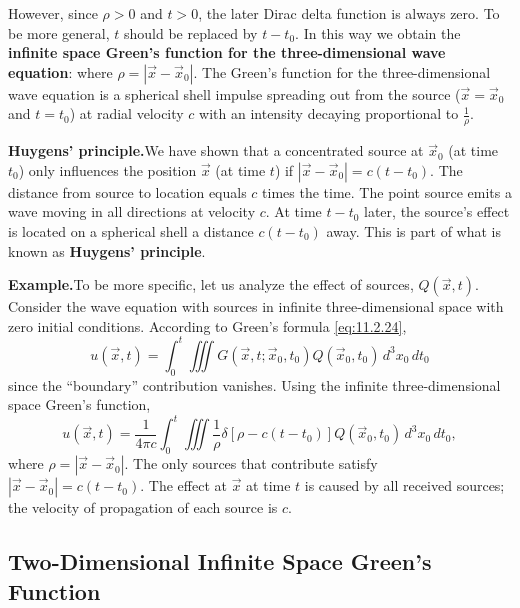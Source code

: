 However, since $\rho > 0$ and $t > 0$, the later Dirac delta function is always zero.  To be more general, $t$ should be replaced by $t - t_0$.  In this way we obtain the \textbf{infinite space Green's function for the three-dimensional wave equation}:
where $\rho = |\vec{x} - \vec{x}_0|$.  The Green's function for the three-dimensional wave equation is a spherical shell impulse spreading out from the source ($\vec{x} = \vec{x}_0$ and $t = t_0$) at radial velocity $c$ with an intensity decaying proportional to $\frac{1}{\rho}$.

\textbf{Huygens' principle.}\quad We have shown that a concentrated source at $\vec{x}_0$ (at time $t_0$) only influences the position $\vec{x}$ (at time $t$) if $|\vec{x} - \vec{x}_0| = c(t - t_0)$.  The distance from source to location equals $c$ times the time.  The point source emits a wave moving in all directions at velocity $c$.  At time $t - t_0$ later, the source's effect is located on a spherical shell a distance $c(t - t_0)$ away.  This is part of what is known as \textbf{Huygens' principle}.

\textbf{Example.}\quad To be more specific, let us analyze the effect of sources, $Q(\vec{x},t)$.  Consider the wave equation with sources in infinite three-dimensional space with zero initial conditions.  According to Green's formula \eqref{eq:11.2.24},
\begin{equation}
\label{eq:11.2.40}
u(\vec{x},t) = \int_0^t \iiint G(\vec{x},t;\vec{x}_0,t_0)Q(\vec{x}_0,t_0)\,d^3x_0\,dt_0
\end{equation}
since the ``boundary'' contribution vanishes.  Using the infinite three-dimensional space Green's function,
\begin{equation}
\label{eq:11.2.41}
u(\vec{x},t) = \frac{1}{4\pi c}\int_0^t \iiint \frac{1}{\rho}\delta[\rho - c(t-t_0)]Q(\vec{x}_0,t_0)\,d^3x_0\,dt_0,
\end{equation}
where $\rho = |\vec{x} - \vec{x}_0|$.  The only sources that contribute satisfy $|\vec{x} - \vec{x}_0| = c(t - t_0)$.  The effect at $\vec{x}$ at time $t$ is caused by all received sources; the velocity of propagation of each source is $c$.

\subsection{Two-Dimensional Infinite Space Green's Function}
\label{subsec:2d-greens-wave}

